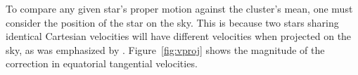 \documentclass[12pt,twocolumn,tighten]{aastex63}
\begin{document}
To compare any given star's proper motion against the cluster's mean,
one must consider the position of the star on the sky.  This is
because two stars sharing identical Cartesian velocities will have
different velocities when projected on the sky, as was emphasized by
\citet{meingast_2021}.
Figure~\ref{fig:vproj} shows the magnitude of the correction in
equatorial tangential velocities.


% 
% 
\end{document}
